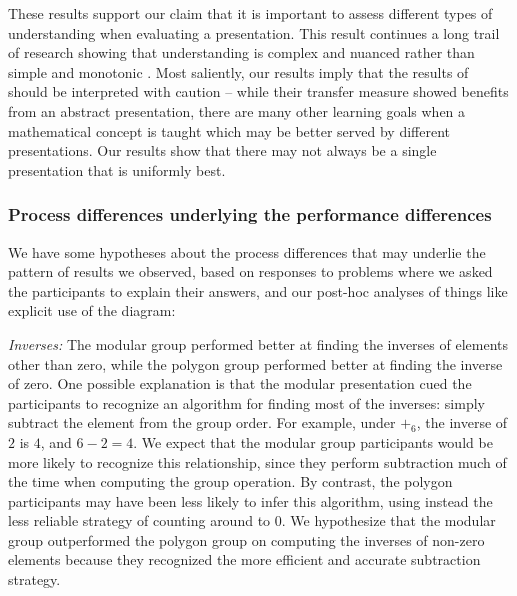 \documentclass[man,10pt]{apa6}
\begin{document}
These results support our claim that it is important to assess different types of understanding when evaluating a presentation. This result continues a long trail of research showing that understanding is complex and nuanced rather than simple and monotonic \cite{Greeno1987,Bisanz1992,Nokes2005}. Most saliently, our results imply that the results of  should be interpreted with caution -- while their transfer measure showed benefits from an abstract presentation, there are many other learning goals when a mathematical concept is taught which may be better served by different presentations. Our results show that there may not always be a single presentation that is uniformly best. 
\subsubsection{Process differences underlying the performance differences}
We have some hypotheses about the process differences that may underlie the pattern of results we observed, based on responses to problems where we asked the participants to explain their answers, and our post-hoc analyses of things like explicit use of the diagram:\par 
\textit{Inverses:} The modular group performed better at finding the inverses of elements other than zero, while the polygon group performed better at finding the inverse of zero. One possible explanation is that the modular presentation cued the participants to recognize an algorithm for finding most of the inverses: simply subtract the element from the group order. For example, under $+_6$, the inverse of $2$ is $4$, and $6-2 = 4$. We expect that the modular group participants would be more likely to recognize this relationship, since they perform subtraction much of the time when computing the group operation. By contrast, the polygon participants may have been less likely to infer this algorithm, using instead the less reliable strategy of counting around to 0. We hypothesize that the modular group outperformed the polygon group on computing the inverses of non-zero elements because they recognized the more efficient and accurate subtraction strategy. \par 
\end{document}
